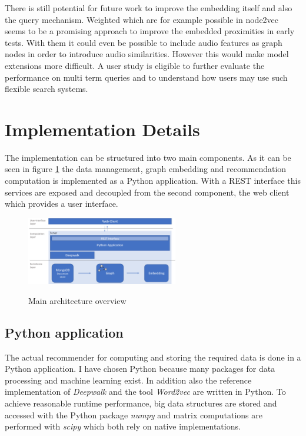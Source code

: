 \documentclass[sigconf]{acmart}
\begin{document}
There is still potential for future work to improve the embedding itself and also the query mechanism. Weighted which are for example possible in node2vec\cite{grover2016node2vec} seems to be a promising approach to improve the embedded proximities in early tests. With them it could even be possible to include audio features as graph nodes in order to introduce audio similarities. However this would make model extensions more difficult. A user study is eligible to further evaluate the performance on multi term queries and to understand how users may use such flexible search systems.





\cleardoublepage
\newpage
\appendix
\section{Implementation Details}

The implementation can be structured into two main components. As it can be seen in figure \ref{fig:architecture} the data management, graph embedding and recommendation computation is implemented as a Python application. With a REST interface this services are exposed and decoupled from the second component, the web client which provides a user interface.

\begin{figure}[ht]
	{\includegraphics[width=250px]{architecture.png}}	
	\caption{Main architecture overview}
	\label{fig:architecture}
\end{figure}

\subsection{Python application}
The actual recommender for computing and storing the required data is done in a Python application. I have chosen Python because many packages for data processing and machine learning exist. In addition also the reference implementation of \emph{Deepwalk} and the tool \emph{Word2vec} are written in Python. To achieve reasonable runtime performance, big data structures are stored and accessed with the Python package \emph{numpy} and matrix computations are performed with \emph{scipy} which both rely on native implementations.
\end{document}
